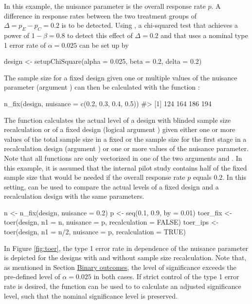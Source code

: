 In this example, the nuisance parameter is the overall response rate
\(p\). A difference in response rates between the two treatment groups
of \(\Delta = p_{E} - p_{C} = 0.2\) is to be detected. Using
, a chi-squared test that achieves a power of
\(1 - \beta = 0.8\) to detect this effect of \(\Delta = 0.2\) and that
uses a nominal type 1 error rate of \(\alpha = 0.025\) can be set up by

\begin{example}
design <- setupChiSquare(alpha = 0.025, beta = 0.2, delta = 0.2)
\end{example}

The sample size for a fixed design given one or multiple values of the
nuisance parameter (argument ) can then be calculated
with the function :

\begin{example}
n_fix(design, nuisance = c(0.2, 0.3, 0.4, 0.5))
#> [1] 124 164 186 194
\end{example}

The function  calculates the actual level of a design with
blinded sample size recalculation or of a fixed design (logical argument
) given either one or more values of the total
sample size in a fixed or the sample size for the first stage in a
recalculation design (argument ) or one or more values of the
nuisance parameter. Note that all functions are only vectorized in one
of the two arguments  and . In this example, it
is assumed that the internal pilot study contains half of the fixed
sample size that would be needed if the overall response rate \(p\)
equals \(0.2\). In this setting,  can be used to
compare the actual levels of a fixed design and a recalculation design
with the same parameters.

\begin{example}
n <- n_fix(design, nuisance = 0.2)
p <- seq(0.1, 0.9, by = 0.01)
toer_fix <- toer(design, n1 = n, nuisance = p, recalculation = FALSE)
toer_ips <- toer(design, n1 = n/2, nuisance = p, recalculation = TRUE)
\end{example}

In Figure \ref{fig:toer}, the type 1 error rate in dependence of the
nuisance parameter is depicted for the designs with and without sample
size recalculation. Note that, as mentioned in Section
\protect\hyperlink{binary-outcomes}{Binary outcomes}, the level of
significance exceeds the pre-defined level of \(\alpha = 0.025\) in both
cases. If strict control of the type 1 error rate is desired, the
function  can be used to to calculate an adjusted
significance level, such that the nominal significance level is
preserved.

